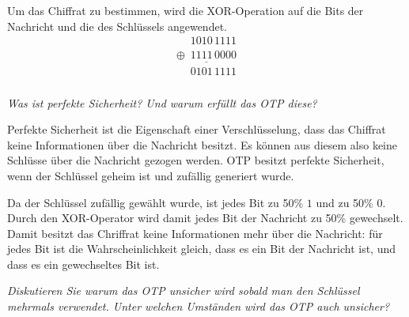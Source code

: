 \documentclass[
  ngerman,
  DIV=12
]{scrartcl}
\begin{document}
\medskip\noindent
Um das Chiffrat zu bestimmen, wird die XOR-Operation auf die Bits der Nachricht und die des Schlüssels angewendet.
\begin{equation*}
\begin{array}{c}
\phantom{\oplus9}1010\,1111\\
\underline{\oplus\phantom{9}1111\,0000}\\
\phantom{\oplus9}0101\,1111\\
\end{array}
\end{equation*}

\bigskip\noindent
\emph{Was ist perfekte Sicherheit? Und warum erfüllt das OTP diese?}

\medskip\noindent
Perfekte Sicherheit ist die Eigenschaft einer Verschlüsselung, dass das Chiffrat keine Informationen über die Nachricht besitzt. Es können aus diesem also keine Schlüsse über die Nachricht gezogen werden. OTP besitzt perfekte Sicherheit, wenn der Schlüssel geheim ist und zufällig generiert wurde. 

Da der Schlüssel zufällig gewählt wurde, ist jedes Bit zu 50\% $1$ und zu 50\% $0$. Durch den XOR-Operator wird damit jedes Bit der Nachricht zu 50\% gewechselt. Damit besitzt das Chriffrat keine Informationen mehr über die Nachricht: für jedes Bit ist die Wahrscheinlichkeit gleich, dass es ein Bit der Nachricht ist, und dass es ein gewechseltes Bit ist.

\bigskip\noindent
\emph{Diskutieren Sie warum das OTP unsicher wird sobald man den Schlüssel mehrmals verwendet. Unter welchen Umständen wird das OTP auch unsicher?}
\end{document}
